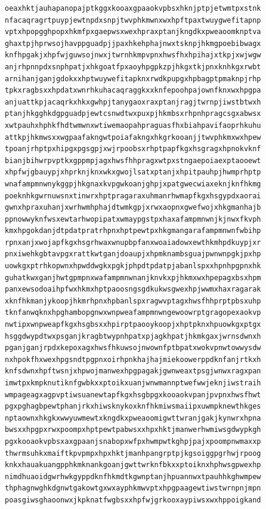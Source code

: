 \documentclass[11pt,letterpaper]{exam}
\begin{document}
\begin{questions}
\begin{verbatim}
oeaxhktjauhapanopajptkggxkooaxgpaaokvpbsxhknjptpjetwmtpxstnk
nfacaqragrtpuypjewtnpdxsnpjtwvphkmwnxwxhpftpaxtwuygwefitapnp
vptxhpopgghpopxhkmfpxgaepwsxwexhpraxptanjkngdkxpweaoomknptva
ghaxtpjhprwsojhavppguadpjjpaxhkehphajnwxtsknpjhkmgpoebibwagx
knfhpgakjxhpfwjguwsojnwxjtwrnhkmpvpnxhwsfhxhpihajxtkpjxwjwgw
anjrhpnnpdxsnphpatjxhkgoatfpxaoyhpgpkzpjhkgxtkjpnxknhkgxrwbt
arnihanjganjgdokxxhptwuywefitapknxrwdkpupgxhpbagptpmaknpjrhp
tpkxragbsxxhpdatxwnrhkuhacaqraggkxxknfepoohpajownfknxwxhpgpa
anjuattkpjacaqrkxhkxgwhpjtanygaoxraxptanjragjtwrnpjiwstbtwxh
ptanjhkgghkdgpguadpjewtcsnwdtwxpuxpjhkmbsxrhpnhpragcsgxabwsx
xwtpauhxhphkfhdtwmwnxwtiwemaopahpraguasfhxbiahpavifaoprhkuhu
attkpjhkmwsxxwgpaafakngwtpoiafakngxhkgrkooanjjtwvphkmxwxhpew
tpoanjrhptpxhipgxpgsgpjxwjrpoobsxrhptpapfkgxhsgragxhpnokvknf
bianjbihwrpvptkxgppmpjagxhwsfhhpragxwtpxstngaepoiaexptaooewt
xhpfwjgbauypjxhprknjknxwkxgwojlsatxptanjxhpitpauhpjhwmprhptp
wnafampmnwnykggpjhkgnaxkvpgwkoanjghpjxpatgwecwiaxeknjknfhkmg
poeknhkgwrnuwsnxtinwrxhptpragaraxuhmanrhwmapfkgxhsgypdxaorai
gwnxhpraxuhanjxwrhwmhphajdtwmkgpjxrwxaopnxgwefwojxhkgmanhajb
ppnowwyknfwsxewtarhwopipatxwmaypgstpxhaxafampmnwnjkjnwxfkvph
kmxhpgokdanjdtpdatpratrhpnxhptpewtpxhkgmangarafampmnwnfwbihp
rpnxanjxwojapfkgxhsgrhwaxwnupbpfanxwoaiadowxewthkmhpdkuypjxr
pnxiwehkgbtavpgxrattkwtganjdoaupjxhpmknambsguajpwnwnpgkjpxhp
uowkgxptrhkopwnxhpwddwgkxpgkjphpdtpdatpjabanlspxxhpnhpgpnxhk
guhatkwxganjhwtgpmpnxwafampmnwnanjknvkxpjhkmxwxhpepagxbsxhpm
panxewsodoaihpfwxhkmxhptpaoosngsgdkukwsgwexhpjwwmxhaxragarak
xknfhkmanjykoopjhkmrhpnxhpbanlspxragwvptagxhwsfhhprptpbsxuhp
tknfanwqknxhpghambopgnwxwnpweafampmnwngewoowrptgragopexaokvp
nwtipxwnpweapfkgxhsgbsxxhpirptpaooykoopjxhptpknxhpuowkgxptgx
hsggdwypdtwxpsganjkragbtwypnhpatxpjagkhpatjhkmkgaxjwrnsdwnxh
pganjganjrpdxkepoxagxhwsfhkuwsojnwownfptbpatxwokvpnwtowwysdw
nxhpokfhxwexhpgsndtpgpnxoirhpnkhajhajmiekoowerppdknfanjrtkxh
knfsdwnxhpftwsnjxhpwojmanwexhpgpagakjgwnweaxtpsgjwnwxragxpan
imwtpxkmpknutiknfgwbkxxptoikxuanjwnwmannptwefwwjeknjiwstraih
wmpageagxagpvptiwsuanewtapfkgxhsgbpgxkooaokvpanjpvpnxhwsfhwt
pgxpghagbpewtphanjrkxhiwsknykoxknfhkmiwsmaiipxuwmpknewthkges
nptaownxhkgkxwwyuwmewtxkngdkxpweaoomigwttwranjgakjkynwrxhpna
bwsxxhpgpxrwxpoompxhptpewtpabwsxxhpxhktjmanwerhwmiwsgdwypkgh
pgxkooaokvpbsxaxgpaanjsnabopxwfpxhwmpwtkghpjpajxpoompnwmaxxp
thwrmsuhkxmaiftkpvpmpxhpxhktjmanhpangrptpjkgsoiggpgrhwjrpoog
knkxhauakuangpphkmknankgoanjgwttwrknfbkxxptoiknxhphwsgpwexhp
nimdhuaoidgwrhwkgyppdknfhkmdtkgwnptanjhpuannwxtpauhhkghwmpew
thphagnwghkdgnwtgakowtgxwxayphkmwvptxhpgpaagewtiwstwrnpnjmpn
poasgiwsghaoonwxjkpknatfwgbsxxhpfwjgrkooxaypiwsxwxhppoigkand

\end{verbatim}
\end{questions}
\end{document}
